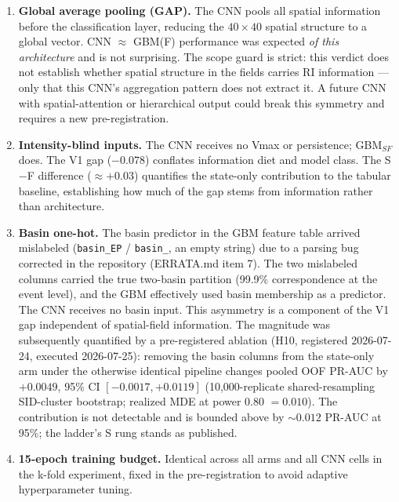 \documentclass[11pt]{article}
\begin{document}
\begin{enumerate}
  \item \textbf{Global average pooling (GAP).} The CNN pools all spatial
  information before the classification layer, reducing the $40\times40$
  spatial structure to a global vector. CNN $\approx$ GBM(F) performance was
  expected \emph{of this architecture} and is not surprising. The scope guard is
  strict: this verdict does not establish whether spatial structure in the
  fields carries RI information --- only that this CNN's aggregation pattern
  does not extract it. A future CNN with spatial-attention or hierarchical
  output could break this symmetry and requires a new pre-registration.

  \item \textbf{Intensity-blind inputs.} The CNN receives no Vmax or
  persistence; GBM$_{SF}$ does. The V1 gap ($-0.078$) conflates information
  diet and model class. The S$-$F difference ($\approx +0.03$) quantifies the
  state-only contribution to the tabular baseline, establishing how much of the
  gap stems from information rather than architecture.

  \item \textbf{Basin one-hot.} The basin predictor in the GBM feature table
  arrived mislabeled (\texttt{basin\_EP} / \texttt{basin\_}, an empty string)
  due to a parsing bug corrected in the repository (ERRATA.md item 7). The two
  mislabeled columns carried the true two-basin partition (99.9\%
  correspondence at the event level), and the GBM effectively used basin
  membership as a predictor. The CNN receives no basin input. This asymmetry is
  a component of the V1 gap independent of spatial-field information. The
  magnitude was subsequently quantified by a pre-registered ablation (H10,
  registered 2026-07-24, executed 2026-07-25): removing the basin columns from
  the state-only arm under the otherwise identical pipeline changes pooled OOF
  PR-AUC by $+0.0049$, 95\% CI $[-0.0017, +0.0119]$ (10{,}000-replicate
  shared-resampling SID-cluster bootstrap; realized MDE at power 0.80 $=
  0.010$). The contribution is not detectable and is bounded above by
  ${\sim}0.012$ PR-AUC at 95\%; the ladder's S rung stands as published.

  \item \textbf{15-epoch training budget.} Identical across all arms and all
  CNN cells in the k-fold experiment, fixed in the pre-registration to avoid
  adaptive hyperparameter tuning.
\end{enumerate}
\end{document}
